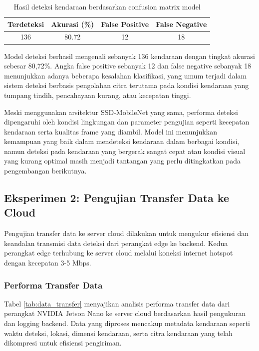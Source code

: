 \begin{table}[htbp]
  \centering
  \begin{tabular}{|c|c|c|c|}
  \hline
  \rowcolor[HTML]{C0C0C0}
  \textbf{Terdeteksi} & \textbf{Akurasi (\%)} & \textbf{False Positive} & \textbf{False Negative} \\
  \hline
  136 & 80.72 & 12 & 18 \\
  \hline
  \end{tabular}
  \caption{Hasil deteksi kendaraan berdasarkan confusion matrix model}
  \label{tab:detection_results_model}
\end{table}

Model deteksi berhasil mengenali sebanyak 136 kendaraan dengan tingkat akurasi sebesar 80,72\%. Angka false positive sebanyak 12 dan false negative sebanyak 18 menunjukkan adanya beberapa kesalahan klasifikasi, yang umum terjadi dalam sistem deteksi berbasis pengolahan citra terutama pada kondisi kendaraan yang tumpang tindih, pencahayaan kurang, atau kecepatan tinggi.

Meski menggunakan arsitektur SSD-MobileNet yang sama, performa deteksi dipengaruhi oleh kondisi lingkungan dan parameter pengujian seperti kecepatan kendaraan serta kualitas frame yang diambil. Model ini menunjukkan kemampuan yang baik dalam mendeteksi kendaraan dalam berbagai kondisi, namun deteksi pada kendaraan yang bergerak sangat cepat atau kondisi visual yang kurang optimal masih menjadi tantangan yang perlu ditingkatkan pada pengembangan berikutnya.

\subsection{Eksperimen 2: Pengujian Transfer Data ke Cloud}
\label{sec:eksperimen2}

Pengujian transfer data ke server cloud dilakukan untuk mengukur efisiensi dan keandalan transmisi data deteksi dari perangkat edge ke backend. Kedua perangkat edge terhubung ke server cloud melalui koneksi internet hotspot dengan kecepatan 3-5 Mbps.

\subsubsection{Performa Transfer Data}

Tabel \ref{tab:data_transfer} menyajikan analisis performa transfer data dari perangkat NVIDIA Jetson Nano ke server cloud berdasarkan hasil pengukuran dan logging backend. Data yang diproses mencakup metadata kendaraan seperti waktu deteksi, lokasi, dimensi kendaraan, serta citra kendaraan yang telah dikompresi untuk efisiensi pengiriman.

